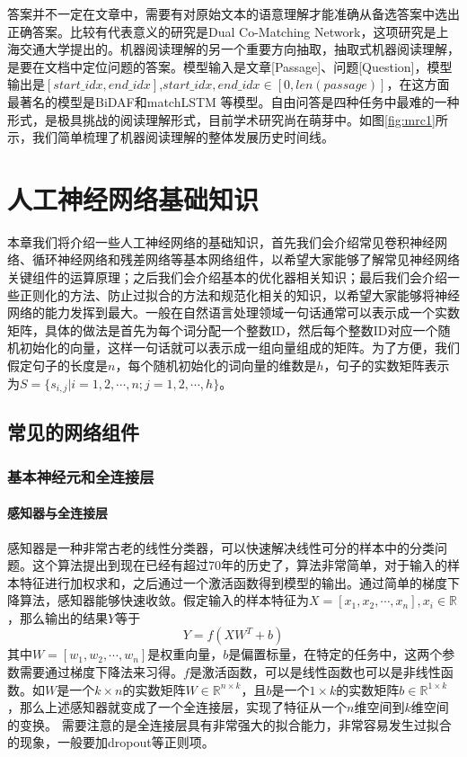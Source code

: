 \documentclass[twoside,a4paper,12pt]{book}%
\begin{document}
答案并不一定在文章中，需要有对原始文本的语意理解才能准确从备选答案中选出正确答案。比较有代表意义的研究是Dual Co-Matching Network，这项研究是上海交通大学提出的。机器阅读理解的另一个重要方向抽取，抽取式机器阅读理解，是要在文档中定位问题的答案。模型输入是文章[Passage]、问题[Question]，模型输出是$[start\_idx,end\_idx]$,$ start\_idx,end\_idx \in [ 0, len(passage) ]$，在这方面最著名的模型是BiDAF和matchLSTM 等模型。自由问答是四种任务中最难的一种形式，是极具挑战的阅读理解形式，目前学术研究尚在萌芽中。如图\ref{fig:mrc1}所示，我们简单梳理了机器阅读理解的整体发展历史时间线。


\chapter{人工神经网络基础知识}
本章我们将介绍一些人工神经网络的基础知识，首先我们会介绍常见卷积神经网络、循环神经网络和残差网络等基本网络组件，以希望大家能够了解常见神经网络关键组件的运算原理；之后我们会介绍基本的优化器相关知识；最后我们会介绍一些正则化的方法、防止过拟合的方法和规范化相关的知识，以希望大家能够将神经网络的能力发挥到最大。一般在自然语言处理领域一句话通常可以表示成一个实数矩阵，具体的做法是首先为每个词分配一个整数ID，然后每个整数ID对应一个随机初始化的向量，这样一句话就可以表示成一组向量组成的矩阵。为了方便，我们假定句子的长度是$n$，每个随机初始化的词向量的维数是$h$，句子的实数矩阵表示为$S=\{s_{i,j}|i=1,2,\cdots,n;j=1,2,\cdots,h\} $。

\section{常见的网络组件}
\subsection{基本神经元和全连接层}
\subsubsection{感知器与全连接层}
感知器是一种非常古老的线性分类器，可以快速解决线性可分的样本中的分类问题。这个算法提出到现在已经有超过70年的历史了，算法非常简单，对于输入的样本特征进行加权求和，之后通过一个激活函数得到模型的输出。通过简单的梯度下降算法，感知器能够快速收敛。假定输入的样本特征为$X=[x_1,x_2,\cdots,x_n],x_i\in \mathbb{R}$，那么输出的结果$Y$等于
$$
Y=f(XW^T+b)
$$
其中$W=[w_1,w_2,\cdots,w_n]$是权重向量，$b$是偏置标量，在特定的任务中，这两个参数需要通过梯度下降法来习得。$f$是激活函数，可以是线性函数也可以是非线性函数。如$W$是一个$k\times n$的实数矩阵$W \in \mathbb{R}^{n\times k}$，且$b$是一个$1\times k$的实数矩阵$b \in \mathbb{R}^{1 \times k}$，那么上述感知器就变成了一个全连接层，实现了特征从一个$n$维空间到$k$维空间的变换。
需要注意的是全连接层具有非常强大的拟合能力，非常容易发生过拟合的现象，一般要加dropout等正则项。
\end{document}

